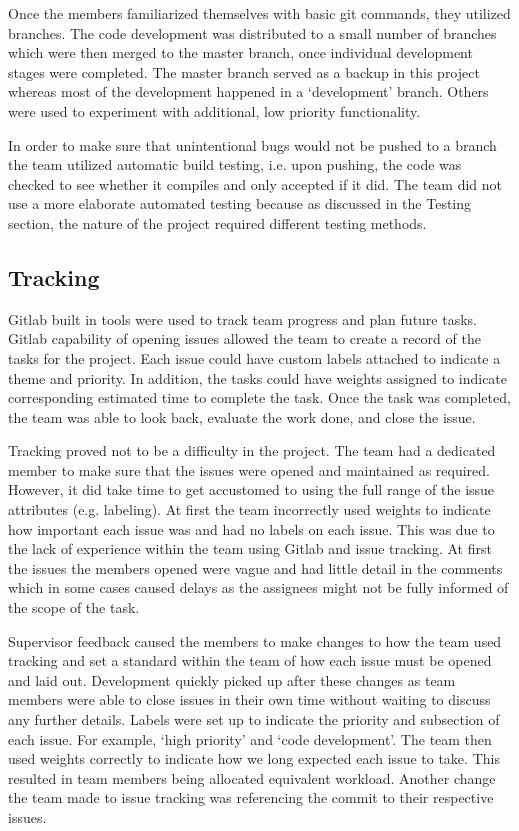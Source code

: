 \documentclass{l3proj}
\begin{document}
Once the members familiarized themselves with basic git commands, they utilized branches. The code development was distributed to a small number of branches which were then merged to the master branch, once individual development stages were completed. The master branch served as a backup in this project whereas most of the development happened in a ‘development' branch. Others were used to experiment with additional, low priority functionality.

In order to make sure that unintentional bugs would not be pushed to a branch the team utilized automatic build testing, i.e. upon pushing, the code was checked to see whether it compiles and only accepted if it did. The team did not use a more elaborate automated testing because as discussed in the Testing section, the nature of the project required different testing methods.

\subsection{Tracking}
Gitlab built in tools were used to track team progress and plan future tasks. Gitlab capability of opening issues allowed the team to create a record of the tasks for the project. Each issue could have custom labels attached to indicate a theme and priority. In addition, the tasks could have weights assigned to indicate corresponding estimated time to complete the task. Once the task was completed, the team was able to look back, evaluate the work done, and close the issue.

Tracking proved not to be a difficulty in the project. The team had a dedicated member to make sure that the issues were opened and maintained as required. However, it did take time to get accustomed to using the full range of the issue attributes (e.g. labeling). At first the team incorrectly used weights to indicate how important each issue was and had no labels on each issue. This was due to the lack of experience within the team using Gitlab and issue tracking. At first the issues the members opened were vague and had little detail in the comments which in some cases caused delays as the assignees might not be fully informed of the scope of the task.
 
Supervisor feedback caused the members to make changes to how the team used tracking and set a standard within the team of how each issue must be opened and laid out. Development quickly picked up after these changes as team members were able to close issues in their own time without waiting to discuss any further details. Labels were set up to indicate the priority and subsection of each issue. For example, ‘high priority' and ‘code development'. The team then used weights correctly to indicate how we long expected each issue to take. This resulted in team members being allocated equivalent workload. Another change the team made to issue tracking was referencing the commit to their respective issues.
\end{document}
